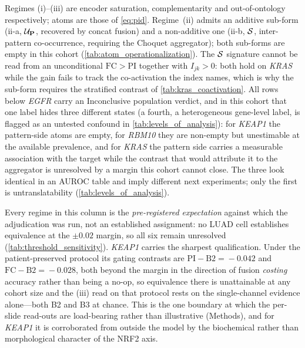 \begin{flushleft}\footnotesize
Regimes (i)--(iii) are encoder saturation, complementarity and
out-of-ontology respectively;
atoms are those of \cref{eq:pid}.
Regime~(ii) admits an additive sub-form (ii-a, $\mathcal{U}_{\mathbf{P}}$,
recovered by concat fusion) and a non-additive one
(ii-b, $\mathcal{S}$, inter-pattern co-occurrence, requiring the Choquet
aggregator);
both sub-forms are empty in this cohort
(\cref{tab:atom_operationalization}).
The $\mathcal{S}$ signature cannot be read from an unconditional
$\mathrm{FC}\!>\!\mathrm{PI}$ together with $I_{jk}>0$: both hold on
\textit{KRAS} while the gain fails to track the co-activation the
index names, which is why the sub-form requires the stratified
contrast of \cref{tab:kras_coactivation}.
All rows below \textit{EGFR} carry an Inconclusive population
verdict, and in this cohort that one label hides three different
states (a fourth, a heterogeneous gene-level label, is flagged as an
untested confound in \cref{tab:levels_of_analysis}): for
\textit{KEAP1} the pattern-side atoms are empty, for \textit{RBM10}
they are non-empty but unestimable at the available prevalence, and
for \textit{KRAS} the pattern side carries a measurable association
with the target while the contrast that would attribute it to the
aggregator is unresolved by a margin this cohort cannot close.
The three look identical in an AUROC table and imply different next
experiments; only the first is untranslatability
(\cref{tab:levels_of_analysis}).
\par\medskip
Every regime in this column is the \emph{pre-registered expectation} against
which the adjudication was run, not an established assignment: no LUAD cell
establishes equivalence at the $\pm0.02$ margin, so all six remain unresolved
(\cref{tab:threshold_sensitivity}). \textit{KEAP1} carries the sharpest
qualification. Under the patient-preserved protocol its gating contrasts are
$\mathrm{PI}-\mathrm{B2}\!=\!-0.042$ and $\mathrm{FC}-\mathrm{B2}\!=\!-0.028$,
both beyond the margin in the direction of fusion \emph{costing} accuracy
rather than being a no-op, so equivalence there is unattainable at any cohort
size and the (iii) read on that protocol rests on the single-channel
evidence alone---both B2 and B3 at chance. This is the one boundary at
which the per-slide read-outs are load-bearing rather than illustrative
(Methods), and for \textit{KEAP1} it is corroborated from outside the
model by the biochemical rather than morphological character of the
NRF2 axis.
\end{flushleft}
